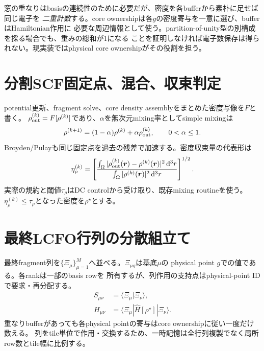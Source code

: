 \documentclass[11pt,a4paper]{article}
\newcommand{\dd}{\mathrm d}
\begin{document}
窓の重なりはbasisの連続性のために必要だが、密度を各bufferから素朴に足せば同じ電子を
\emph{二重計数}する。core ownershipは各$g$の密度寄与を一意に選び、bufferはHamiltonian作用に
必要な周辺情報として使う。partition-of-unity型の別構成を採る場合でも、重みの総和が1になる
ことを証明しなければ電子数保存は得られない。現実装ではphysical core ownershipがその役割を担う。

\section{分割SCF固定点、混合、収束判定}
potential更新、fragment solve、core density assemblyをまとめた密度写像を$F$と書く。
$\rho_{\rm out}^{(k)}=F[\rho^{(k)}]$であり、$\alpha$を無次元mixing率としてsimple mixingは
\begin{equation}
 \rho^{(k+1)}=(1-\alpha)\rho^{(k)}+\alpha\rho_{\rm out}^{(k)},
 \qquad0<\alpha\le1.
\end{equation}
Broyden/Pulayも同じ固定点を過去の残差で加速する。密度収束量の代表形は
\begin{equation}
 \eta_\rho^{(k)}=\left[
 \frac{\int_\Omega|\rho_{\rm out}^{(k)}(\boldsymbol r)-\rho^{(k)}(\boldsymbol r)|^2\,\dd^3r}
 {\int_\Omega|\rho^{(k)}(\boldsymbol r)|^2\,\dd^3r}\right]^{1/2}.
 \label{eq:rhores}
\end{equation}
実際の規約と閾値$\tau_\rho$はDC controlから受け取り、既存mixing routineを使う。
$\eta_\rho^{(k)}\le\tau_\rho$となった密度を$\rho^\star$とする。

\section{最終LCFO行列の分散組立て}
最終fragment列を$\{\Xi_\mu\}_{\mu=1}^{M}$へ並べる。$\Xi_{\mu g}$は基底$\mu$の
physical point $g$での値である。各rankは一部のbasis rowを
所有するが、列作用の支持点はphysical-point IDで要求・再分配する。
\begin{align}
 S_{\mu\nu}&=\langle\Xi_\mu|\Xi_\nu\rangle,\\
 H_{\mu\nu}&=\langle\Xi_\mu|\hat H[\rho^\star]|\Xi_\nu\rangle.
 \label{eq:lcfo}
\end{align}
重なりbufferがあっても各physical pointの寄与はcore ownershipに従い一度だけ数える。
列をtile単位で作用・交換するため、一時記憶は全行列複製でなく局所row数とtile幅に比例する。
\end{document}
